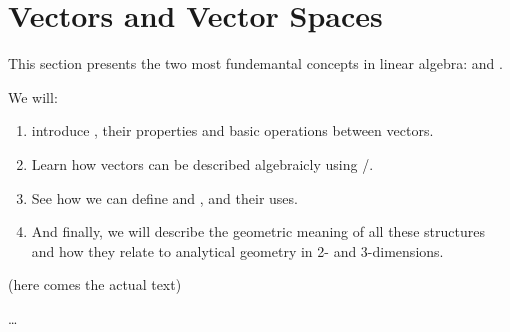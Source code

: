 \section{Vectors and Vector Spaces}
\begin{summary}{}{}
	This section presents the two most fundemantal concepts in linear algebra:  and .

	We will:
	\begin{enumerate}
		\item introduce , their properties and basic operations between vectors.
		\item Learn how vectors can be described algebraicly using /.
		\item See how we can define  and , and their uses.
		\item And finally, we will describe the geometric meaning of all these structures and how they relate to analytical geometry in 2- and 3-dimensions.
	\end{enumerate}
\end{summary}

(here comes the actual text)

\dots
